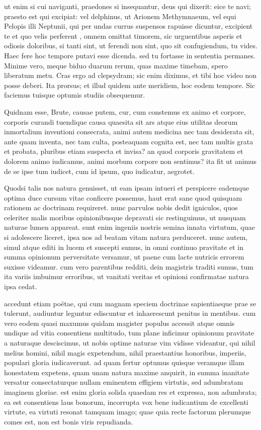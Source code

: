  ut enim si cui naviganti, praedones si insequantur, deus qui dixerit: eice te navi; praesto est qui excipiat: vel delphinus, ut Arionem Methymnaeum, vel equi Pelopis illi Neptunii, qui per undas currus suspensos rapuisse dicuntur, excipient te et quo velis perferent , omnem omittat timorem, sic urguentibus asperis et odiosis doloribus, si tanti sint, ut ferendi non sint, quo sit confugiendum, tu vides. Haec fere hoc tempore putavi esse dicenda. sed tu fortasse in sententia permanes. Minime vero, meque biduo duarum rerum, quas maxime timebam, spero liberatum metu. Cras ergo ad clepsydram; sic enim diximus, et tibi hoc video non posse deberi. Ita prorsus; et illud quidem ante meridiem, hoc eodem tempore. Sic faciemus tuisque optumis studiis obsequemur.

 Quidnam esse, Brute, causae putem, cur, cum constemus ex animo et corpore, corporis curandi tuendique causa quaesita sit ars atque eius utilitas deorum inmortalium inventioni consecrata, animi autem medicina nec tam desiderata sit, ante quam inventa, nec tam culta, posteaquam cognita est, nec tam multis grata et probata, pluribus etiam suspecta et invisa? an quod corporis gravitatem et dolorem animo iudicamus, animi morbum corpore non sentimus? ita fit ut animus de se ipse tum iudicet, cum id ipsum, quo iudicatur, aegrotet.

 Quodsi talis nos natura genuisset, ut eam ipsam intueri et perspicere eademque optima duce cursum vitae conficere possemus, haut erat sane quod quisquam rationem ac doctrinam requireret. nunc parvulos nobis dedit igniculos, quos celeriter malis moribus opinionibusque depravati sic restinguimus, ut nusquam naturae lumen appareat. sunt enim ingeniis nostris semina innata virtutum, quae si adolescere liceret, ipsa nos ad beatam vitam natura perduceret. nunc autem, simul atque editi in lucem et suscepti sumus, in omni continuo pravitate et in summa opinionum perversitate versamur, ut paene cum lacte nutricis errorem suxisse videamur. cum vero parentibus redditi, dein magistris traditi sumus, tum ita variis imbuimur erroribus, ut vanitati veritas et opinioni confirmatae natura ipsa cedat.

 accedunt etiam poëtae, qui cum magnam speciem doctrinae sapientiaeque prae se tulerunt, audiuntur leguntur ediscuntur et inhaerescunt penitus in mentibus. cum vero eodem quasi maxumus quidam magister populus accessit atque omnis undique ad vitia consentiens multitudo, tum plane inficimur opinionum pravitate a naturaque desciscimus, ut nobis optime naturae vim vidisse videantur, qui nihil melius homini, nihil magis expetendum, nihil praestantius honoribus, imperiis, populari gloria iudicaverunt. ad quam fertur optumus quisque veramque illam honestatem expetens, quam unam natura maxime anquirit, in summa inanitate versatur consectaturque nullam eminentem effigiem virtutis, sed adumbratam imaginem gloriae. est enim gloria solida quaedam res et expressa, non adumbrata; ea est consentiens laus bonorum, incorrupta vox bene iudicantium de excellenti virtute, ea virtuti resonat tamquam imago; quae quia recte factorum plerumque comes est, non est bonis viris repudianda.

